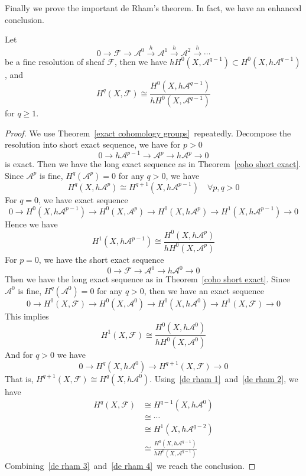 Finally we prove the important de Rham's theorem.
In fact, we have an enhanced conclusion.
\begin{thm}\label{fine de rham}
    Let
    \[0\to\mathcal{F}\to\mathcal{A}^0\xrightarrow{h}\mathcal{A}^1\xrightarrow{h}\mathcal{A}^2\xrightarrow{h}\cdots\]
    be a fine resolution of sheaf $\mathcal{F}$, then we have $hH^0(X,\mathcal{A}^{q-1})\subset H^0(X,h\mathcal{A}^{q-1})$, and
    \[H^q(X,\mathcal{F})\cong\frac{H^0(X,h\mathcal{A}^{q-1})}{hH^0(X,\mathcal{A}^{q-1})}\]
    for $q\geq 1$.
\end{thm}
\begin{proof}
    We use Theorem~\ref{exact cohomology groups}~repeatedly.
    Decompose the resolution into short exact sequence, we have for $p>0$
    \[0\to h\mathcal{A}^{p-1}\to\mathcal{A}^p\to h\mathcal{A}^p\to 0\]
    is exact.
    Then we have the long exact sequence as in Theorem~\ref{coho short exact}.
    Since $\mathcal{A}^p$ is fine, $H^q(\mathcal{A}^p)=0$ for any $q>0$, we have
    \begin{equation}
        H^q(X,h\mathcal{A}^p)\cong H^{q+1}(X,h\mathcal{A}^{p-1})\quad \forall p,q>0\label{de rham 1}
    \end{equation}
    For $q=0$, we have exact sequence
    \[0\to H^0(X,h\mathcal{A}^{p-1})\to H^0(X,\mathcal{A}^p)\to H^0(X,h\mathcal{A}^p)\to H^1(X,h\mathcal{A}^{p-1})\to 0\]
    Hence we have
    \begin{equation}
        H^1(X,h\mathcal{A}^{p-1})\cong\frac{H^0(X,h\mathcal{A}^p)}{hH^0(X,\mathcal{A}^p)}\label{de rham 2}
    \end{equation}
    For $p=0$, we have the short exact sequence
    \[0\to\mathcal{F}\to\mathcal{A}^0\to h\mathcal{A}^0\to 0\]
    Then we have the long exact sequence as in Theorem~\ref{coho short exact}.
    Since $\mathcal{A}^0$ is fine, $H^q(\mathcal{A}^0)=0$ for any $q>0$, then we have an exact sequence
    \[0\to H^0(X,\mathcal{F})\to H^0(X,\mathcal{A}^0)\to H^0(X,h\mathcal{A}^0)\to H^1(X,\mathcal{F})\to 0\]
    This implies
    \begin{equation}
        H^1(X,\mathcal{F})\cong\frac{H^0(X,h\mathcal{A}^0)}{hH^0(X,\mathcal{A}^0)}\label{de rham 3}
    \end{equation}
    And for $q>0$ we have
    \[0\to H^q(X,h\mathcal{A}^0)\to H^{q+1}(X,\mathcal{F})\to 0\]
    That is, $H^{q+1}(X,\mathcal{F})\cong H^q(X,h\mathcal{A}^0)$.
    Using~\eqref{de rham 1}~and~\eqref{de rham 2}, we have
    \begin{equation}
        \begin{aligned}
            H^q(X,\mathcal{F})&\cong H^{q-1}(X,h\mathcal{A}^0)\\
            &\cong\cdots\\
            &\cong H^1(X,h\mathcal{A}^{q-2})\\
            &\cong\frac{H^0(X,h\mathcal{A}^{q-1})}{hH^0(X,\mathcal{A}^{q-1})}
        \end{aligned}\label{de rham 4}
    \end{equation}
    Combining~\eqref{de rham 3}~and~\eqref{de rham 4}~we reach the conclusion.
\end{proof}

